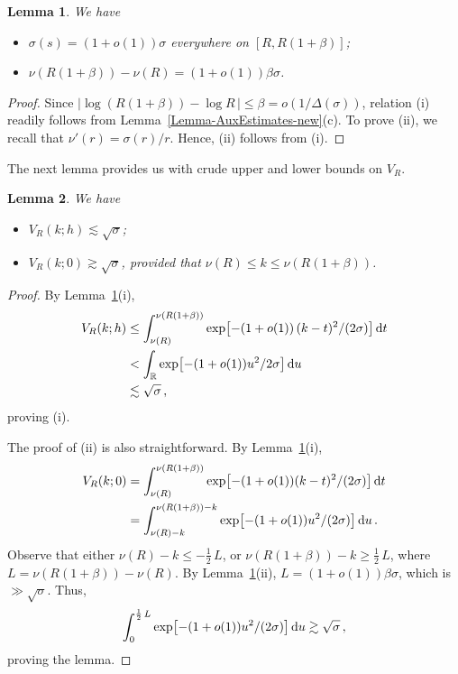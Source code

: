 \documentclass[11pt]{amsart}
\numberwithin{equation}{section}
\newtheorem{lemma}{Lemma}[section]
\newcommand{\bR}{\mathbb R}
\begin{document}
\begin{lemma}\label{Lemma5A}
We have
\begin{itemize}
\item[{\rm (i)}]
$\sigma (s) = (1+o(1))\sigma $ everywhere on $[R, R(1+\beta)]$;
\item[{\rm (ii)}]
$\nu(R(1+\beta))-\nu (R) = (1+o(1))\beta\sigma$.
\end{itemize}
\end{lemma}

\begin{proof}
Since $|\log(R(1+\beta))-\log R \,| \le \beta = o(1/\Delta(\sigma))$,
relation (i) readily follows from Lemma~\ref{Lemma-AuxEstimates-new}(c).
To prove (ii), we recall that $\nu'(r) = \sigma (r)/r$. Hence,
(ii) follows from (i).
\end{proof}

The next lemma provides us with crude upper and lower bounds on $V_R$.

\begin{lemma}\label{Lemma5C}
We have
\begin{itemize}
\item[{\rm (i)}] $V_R(k; h)\lesssim \sqrt{\sigma}$;
\item[{\rm (ii)}] $V_R(k; 0) \gtrsim \sqrt{\sigma}$,
provided that  $\nu(R)\le k \le \nu(R(1+\beta))$.
\end{itemize}
\end{lemma}

\begin{proof}
By Lemma~\ref{Lemma5A}(i),
\begin{align*}
V_R(k; h) &\le \int_{\nu(R)}^{\nu(R(1+\beta))}
\exp\bigl[ - (1+o(1))\,(k-t)^2/(2\sigma)\bigr]\, {\rm d}t \\
&<\int_\bR \exp\bigl[ -(1+o(1))u^2/{2\sigma} \bigr]\, {\rm d}u \\
&\lesssim\sqrt{\sigma}\,,
\end{align*}
proving (i).

The proof of (ii) is also straightforward. By Lemma~\ref{Lemma5A}(i),
\begin{align*}
V_R(k; 0) &=
\int_{\nu(R)}^{\nu(R(1+\beta))} \exp\bigl[ - (1+o(1))(k-t)^2/(2\sigma) \bigr]\, {\rm d}t \\
&=
\int_{\nu(R)-k}^{\nu(R(1+\beta))-k} \exp\bigl[ - (1+o(1))u^2/(2\sigma) \bigr]\, {\rm d}u\,.
\end{align*}
Observe that either $\nu (R) - k \le -\tfrac12\,L$, or $\nu (R(1+\beta))-k \ge \tfrac12\, L$,
where $L=\nu (R(1+\beta))-\nu (R)$. By Lemma~\ref{Lemma5A}(ii), $L=(1+o(1))\beta\sigma$, which is
$\gg \sqrt{\sigma}$. Thus,
\[
\int_0^{\frac12\, L} \exp\bigl[ - (1+o(1))u^2/(2\sigma) \bigr]\, {\rm d}u \gtrsim \sqrt{\sigma}\,,
\]
proving the lemma.
\end{proof}
\end{document}

